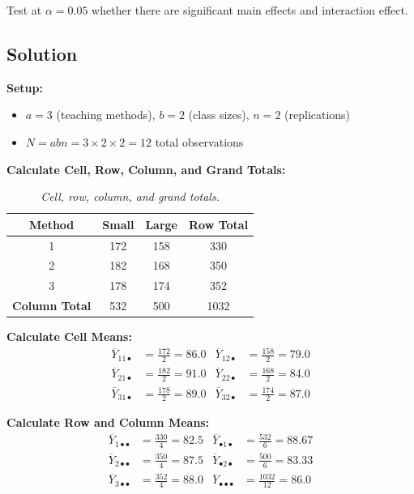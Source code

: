 \documentclass[twoside]{book}
\begin{document}
Test at $\alpha = 0.05$ whether there are significant main effects and interaction effect.

\subsection{Solution}

\textbf{Setup:}
\begin{itemize}
\item $a = 3$ (teaching methods), $b = 2$ (class sizes), $n = 2$ (replications)
\item $N = abn = 3 \times 2 \times 2 = 12$ total observations
\end{itemize}

\textbf{Calculate Cell, Row, Column, and Grand Totals:}

\begin{table}[H]
\centering
\begin{tabular}{c|c|c|c}
\toprule
\textbf{Method} & \textbf{Small} & \textbf{Large} & \textbf{Row Total} \\
\midrule
1 & 172 & 158 & 330 \\
2 & 182 & 168 & 350 \\
3 & 178 & 174 & 352 \\
\midrule
\textbf{Column Total} & 532 & 500 & 1032 \\
\bottomrule
\end{tabular}
\caption{\textit{Cell, row, column, and grand totals.}}
\end{table}

\textbf{Calculate Cell Means:}
\begin{align*}
\overline{Y}_{11\bullet} &= \frac{172}{2} = 86.0 & \overline{Y}_{12\bullet} &= \frac{158}{2} = 79.0 \\
\overline{Y}_{21\bullet} &= \frac{182}{2} = 91.0 & \overline{Y}_{22\bullet} &= \frac{168}{2} = 84.0 \\
\overline{Y}_{31\bullet} &= \frac{178}{2} = 89.0 & \overline{Y}_{32\bullet} &= \frac{174}{2} = 87.0
\end{align*}

\textbf{Calculate Row and Column Means:}
\begin{align*}
\overline{Y}_{1\bullet\bullet} &= \frac{330}{4} = 82.5 & \overline{Y}_{\bullet 1\bullet} &= \frac{532}{6} = 88.67 \\
\overline{Y}_{2\bullet\bullet} &= \frac{350}{4} = 87.5 & \overline{Y}_{\bullet 2\bullet} &= \frac{500}{6} = 83.33 \\
\overline{Y}_{3\bullet\bullet} &= \frac{352}{4} = 88.0 & \overline{Y}_{\bullet\bullet\bullet} &= \frac{1032}{12} = 86.0
\end{align*}
\end{document}
